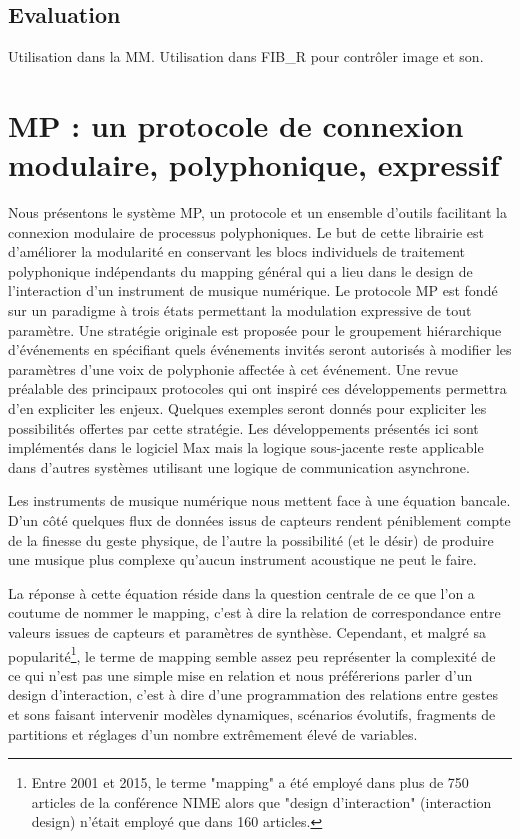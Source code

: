 \subsection{Evaluation}
Utilisation dans la MM. Utilisation dans FIB\_R pour contrôler image et son.



\section{MP : un protocole de connexion modulaire, polyphonique, expressif}
\label{sec:algorithms:MP}

Nous présentons le système MP, un protocole et un ensemble d'outils facilitant la connexion modulaire de processus polyphoniques. Le but de cette librairie est d'améliorer la modularité en conservant les blocs individuels de traitement polyphonique indépendants du mapping général qui a lieu dans le design de l'interaction d'un instrument de musique numérique. Le protocole MP est fondé sur un paradigme à trois états permettant la modulation expressive de tout paramètre. Une stratégie originale est proposée pour le groupement hiérarchique d'événements en spécifiant quels événements invités seront autorisés à modifier les paramètres d'une voix de polyphonie affectée à cet événement. Une revue préalable des principaux protocoles qui ont inspiré ces développements permettra d'en expliciter les enjeux. Quelques exemples seront donnés pour expliciter les possibilités offertes par cette stratégie. Les développements présentés ici sont implémentés dans le logiciel Max mais la logique sous-jacente reste applicable dans d'autres systèmes utilisant une logique de communication asynchrone.

Les instruments de musique numérique nous mettent face à une équation bancale. D'un côté quelques flux de données issus de capteurs rendent péniblement compte de la finesse du geste physique, de l'autre la possibilité (et le désir) de produire une musique plus complexe qu'aucun instrument acoustique ne peut le faire.

La réponse à cette équation réside dans la question centrale de ce que l'on a coutume de nommer le mapping, c'est à dire la relation de correspondance entre valeurs issues de capteurs et paramètres de synthèse. Cependant, et malgré sa popularité\footnote{ Entre 2001 et 2015, le terme "mapping" a été employé dans plus de 750 articles de la conférence \gls{NIME} alors que "design d'interaction" (interaction design) n'était employé que dans 160 articles.}, le terme de mapping semble assez peu représenter la complexité de ce qui n'est pas une simple mise en relation et nous préférerions parler d'un design d'interaction, c'est à dire d'une programmation des relations entre gestes et sons faisant intervenir modèles dynamiques, scénarios évolutifs, fragments de partitions et réglages d'un nombre extrêmement élevé de variables.


